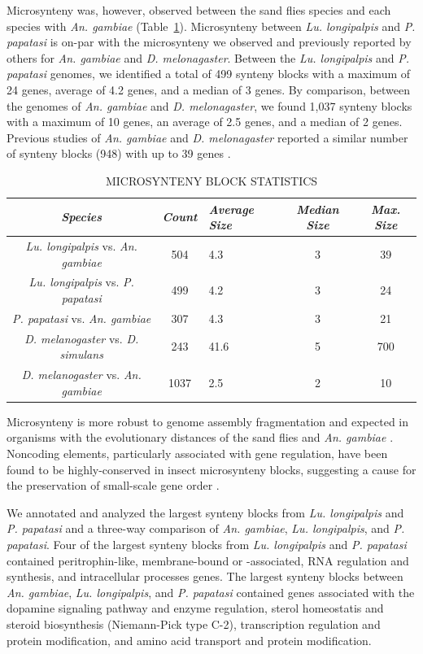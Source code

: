 Microsynteny was, however, observed between the sand flies species and each species with \emph{An. gambiae} (Table~\ref{tab:synteny-block-stats}). Microsynteny between \emph{Lu. longipalpis} and \emph{P. papatasi} is on-par with the microsynteny we observed and previously reported by others for \emph{An. gambiae} and \emph{D. melonagaster}.  Between the \emph{Lu. longipalpis} and \emph{P. papatasi} genomes, we identified a total of 499 synteny blocks with a maximum of 24 genes, average of 4.2 genes, and a median of 3 genes. By comparison, between the genomes of \emph{An. gambiae} and \emph{D. melonagaster}, we found 1,037 synteny blocks with a maximum of 10 genes, an average of 2.5 genes, and a median of 2 genes. Previous studies of \emph{An. gambiae} and \emph{D. melonagaster} reported a similar number of synteny blocks (948) with up to 39 genes \cite{Zdobnov2002}.

\begin{table}[H]
  \begin{center}
    \small
  \caption{\label{tab:synteny-block-stats} MICROSYNTENY BLOCK STATISTICS}
  \begin{tabular}{c c p{1cm} c c} \hline
    \emph{Species} & \emph{Count} & \emph{Average Size} & \emph{Median Size} & \emph{Max. Size} \\ \hline
    \emph{Lu. longipalpis} vs. \emph{An. gambiae} & 504 & 4.3 & 3 & 39 \\
    \emph{Lu. longipalpis} vs. \emph{P. papatasi} & 499 & 4.2 & 3 & 24 \\
    \emph{P. papatasi} vs. \emph{An. gambiae} & 307 & 4.3 & 3 & 21 \\
    \emph{D. melanogaster} vs. \emph{D. simulans} & 243 & 41.6 & 5 & 700 \\
    \emph{D. melanogaster} vs. \emph{An. gambiae} & 1037 & 2.5 & 2 & 10
  \end{tabular}
  \end{center}
\end{table}

Microsynteny is more robust to genome assembly fragmentation and expected in organisms with the evolutionary distances of the sand flies and \emph{An. gambiae} \cite{Zdobnov2002}. Noncoding elements, particularly associated with gene regulation, have been found to be highly-conserved in insect microsynteny blocks, suggesting a cause for the preservation of small-scale gene order \cite{Engstrom2007}.

We annotated and analyzed the largest synteny blocks from \emph{Lu. longipalpis} and \emph{P. papatasi} and a three-way comparison of \emph{An. gambiae}, \emph{Lu. longipalpis}, and \emph{P. papatasi}.  Four of the largest synteny blocks from \emph{Lu. longipalpis} and \emph{P. papatasi} contained peritrophin-like, membrane-bound or -associated, RNA regulation and synthesis, and intracellular processes genes. The largest synteny blocks between \emph{An. gambiae}, \emph{Lu. longipalpis}, and \emph{P. papatasi} contained genes associated with the dopamine signaling pathway and enzyme regulation, sterol homeostatis and steroid biosynthesis (Niemann-Pick type C-2), transcription regulation and protein modification, and amino acid transport and protein modification.

